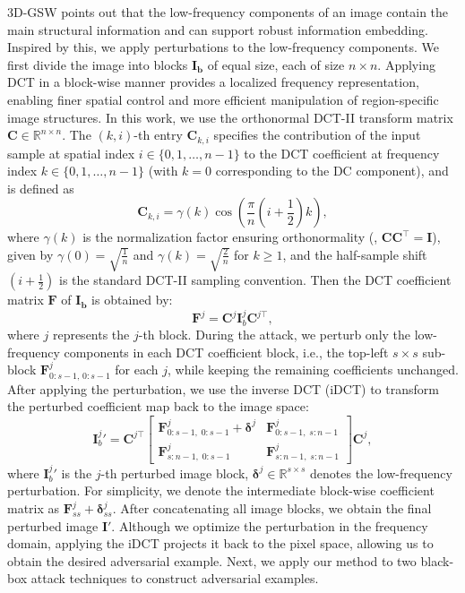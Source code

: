 \documentclass[runningheads]{llncs}
\begin{document}
3D-GSW\cite{jang20243d} points out that the low-frequency components of an image contain the main structural information and can support robust information embedding. Inspired by this, we apply perturbations to the low-frequency components. We first divide the image into blocks $\bm{I_b}$ of equal size, each of size $n\times{n}$. Applying DCT in a block-wise manner provides a localized frequency representation, enabling finer spatial control and more efficient manipulation of region-specific image structures. In this work, we use the orthonormal DCT-II transform matrix $\bm{C}\in\mathbb{R}^{n\times n}$. The $(k,i)$-th entry $\bm{C}_{k,i}$ specifies the contribution of the input sample at spatial index $i\in\{0,1,\ldots,n-1\}$ to the DCT coefficient at frequency index $k\in\{0,1,\ldots,n-1\}$ (with $k=0$ corresponding to the DC component), and is defined as
\begin{equation}   \bm{C}_{k,i}=\gamma(k)\cos\!\left(\frac{\pi}{n}\left(i+\frac{1}{2}\right)k\right),
\end{equation}
where $\gamma(k)$ is the normalization factor ensuring orthonormality (\ie, $\bm{CC}^\top=\bm{I}$), given by $\gamma(0)=\sqrt{\frac{1}{n}}$ and $\gamma(k)=\sqrt{\frac{2}{n}}$ for $k\ge 1$, and the half-sample shift $\left(i+\frac{1}{2}\right)$ is the standard DCT-II sampling convention. Then the DCT coefficient matrix $\bm{F}$ of $\bm{I_b}$ is obtained by:
\begin{equation}
    \bm{F}^j = \bm{C}^j \bm{I}_b^j \bm{C}^{j\top},
\end{equation}
where $j$ represents the $j$-th block. During the attack, we perturb only the low-frequency components in each DCT coefficient block, i.e., the top-left $s\times s$ sub-block $\bm{F}_{0:s-1,\,0:s-1}^j$ for each $j$, while keeping the remaining coefficients unchanged. After applying the perturbation, we use the inverse DCT (iDCT) to transform the perturbed coefficient map back to the image space:
\begin{equation}
{\bm{I}_b^j}' = \bm{C}^{j\top}
\begin{bmatrix}
\bm{F}_{0:s-1,\;0:s-1}^j+\bm{\delta}^j & \bm{F}_{0:s-1,\;s:n-1}^j\\[3pt]
\bm{F}_{s:n-1,\;0:s-1}^j & \bm{F}_{s:n-1,\;s:n-1}^j
\end{bmatrix}\bm{C}^j,
\end{equation}
where ${\bm{I}_b^j}'$ is the $j$-th perturbed image block, $\bm{\delta}^j\in\mathbb{R}^{s\times s}$ denotes the low-frequency perturbation. For simplicity, we denote the intermediate block-wise coefficient matrix as $\bm{F}^j_{ss}+\bm{\delta}_{ss}^j$. After concatenating all image blocks, we obtain the final perturbed image $\bm{I}'$. Although we optimize the perturbation in the frequency domain, applying the iDCT projects it back to the pixel space, allowing us to obtain the desired adversarial example. Next, we apply our method to two black-box attack techniques to construct adversarial examples.
\end{document}
